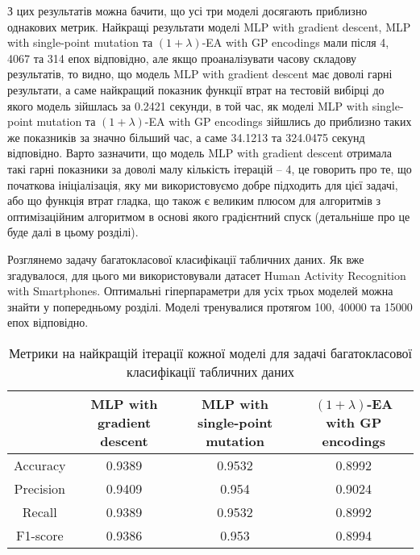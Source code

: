 З цих результатів можна бачити, що усі три моделі досягають приблизно однакових метрик. Найкращі результати моделі MLP with gradient descent, MLP with single-point mutation та $(1+\lambda)$-EA with GP encodings мали після 4, 4067 та 314 епох відповідно, але якщо проаналізувати часову складову результатів, то видно, що модель MLP with gradient descent має доволі гарні результати, а саме найкращий показник функції втрат на тестовій вибірці до якого модель зійшлась за 0.2421 секунди, в той час, як моделі MLP with single-point mutation та $(1+\lambda)$-EA with GP encodings зійшлись до приблизно таких же показників за значно більший час, а саме 34.1213 та 324.0475 секунд відповідно. Варто зазначити, що модель MLP with gradient descent отримала такі гарні показники за доволі малу кількість ітерацій -- 4, це говорить про те, що початкова ініціалізація, яку ми використовуємо добре підходить для цієї задачі, або що функція втрат гладка, що також є великим плюсом для алгоритмів з оптимізаційним алгоритмом в основі якого градієнтний спуск (детальніше про це буде далі в цьому розділі).

Розглянемо задачу багатокласової класифікації табличних даних. Як вже згадувалося, для цього ми використовували датасет Human Activity Recognition with Smartphones. Оптимальні гіперпараметри для усіх трьох моделей можна знайти у попередньому розділі. Моделі тренувалися протягом 100, 40000 та 15000 епох відповідно.

\begin{table}[ht]
	\centering
	\begin{adjustbox}{max width=\textwidth}
		\begin{tabular}{|c|c|c|c|}
			\hline 
			& MLP with gradient descent & MLP with single-point mutation & $(1+\lambda)$-EA with GP encodings \\
			\hline 
			Accuracy & 0.9389 & 0.9532 & 0.8992 \\
			\hline 
			Precision & 0.9409 & 0.954 & 0.9024 \\
			\hline
			Recall & 0.9389 & 0.9532 & 0.8992 \\
			\hline
			F1-score & 0.9386 & 0.953 & 0.8994 \\
			\hline
		\end{tabular}
	\end{adjustbox}
	\caption{Метрики на найкращій ітерації кожної моделі для задачі багатокласової класифікації табличних даних}
	\label{metrics_mc_td_results}
\end{table}

